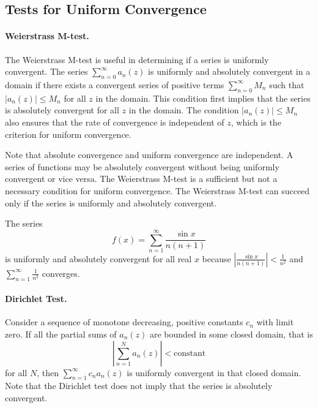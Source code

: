 \subsection{Tests for Uniform Convergence}

\paragraph{Weierstrass M-test.}
The Weierstrass M-test
is useful in determining if a series is uniformly convergent.
The series $\sum_{n = 0}^\infty a_n(z)$ is uniformly and absolutely convergent in a 
domain if there exists a convergent series of positive terms
$\sum_{n = 0}^\infty M_n$ such that $|a_n(z)| \leq M_n$ for all $z$ in the domain.
This condition first implies that the series is absolutely convergent
for all $z$ in the domain.
The condition $|a_n(z)| \leq M_n$ also ensures that the rate of convergence is
independent of $z$, which is the criterion for uniform convergence.

Note that absolute convergence and uniform convergence are independent.
A series of functions may be absolutely convergent without being uniformly
convergent or vice versa.  The Weierstrass M-test is a sufficient but not a
necessary condition for uniform convergence.  The Weierstrass M-test can
succeed only if the series is uniformly and absolutely convergent.



\begin{Example}
  The series 
  \[ 
  f(x) = \sum_{n=1}^\infty \frac{\sin x}{n(n+1)} 
  \]
  is uniformly and absolutely convergent for all real $x$ because
  $|\frac{\sin x}{n (n+1)}| < \frac{1}{n^2}$ and $\sum_{n=1}^\infty \frac{1}{n^2}$
  converges.
\end{Example}






\paragraph{Dirichlet Test.}
Consider a sequence of monotone decreasing, positive constants ${c_n}$ with
limit zero.  If all the partial sums of $a_n(z)$ are bounded in some 
closed domain, that is
\[
\left| \sum_{n=1}^N a_n(z) \right| < \mathrm{constant}
\]
for all $N$, then $\sum_{n = 1}^\infty c_n a_n(z)$
is uniformly convergent in that closed domain.  Note that the Dirichlet
test does not imply that the series is absolutely convergent.




